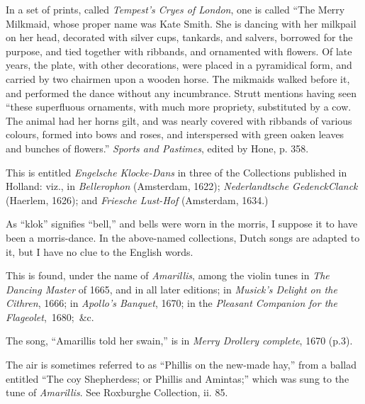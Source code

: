 In a set of prints, called \textit{Tempest's Cryes of London}, one is called “The Merry
Milkmaid, whose proper name was Kate Smith. She is dancing with her milkpail
on her head, decorated with silver cups, tankards, and salvers, borrowed for
the purpose, and tied together with ribbands, and ornamented with flowers. Of
late years, the plate, with other decorations, were placed in a pyramidical form,
and carried by two chairmen upon a wooden horse. The mikmaids walked before
it, and performed the dance without any incumbrance. Strutt mentions having
seen “these superfluous ornaments, with much more propriety, substituted by a
cow. The animal had her horns gilt, and was nearly covered with ribbands of
various colours, formed into bows and roses, and interspersed with green oaken
leaves and bunches of flowers.” \textit{Sports and Pastimes}, edited by Hone, p. 358.



\pagebreak


This is entitled \textit{Engelsche Klocke-Dans} in three of the Collections published in
Holland: viz., in \textit{Bellerophon} (Amsterdam, 1622); \textit{Nederlandtsche GedenckClanck}
(Haerlem, 1626); and \textit{Friesche Lust-Hof} (Amsterdam, 1634.)

As “klok” signifies “bell,” and bells were worn in the morris, I suppose it to
have been a morris-dance. In the above-named collections, Dutch songs are
adapted to it, but I have no clue to the English words.




This is found, under the name of \textit{Amarillis}, among the violin tunes in \textit{The
Dancing Master} of 1665, and in all later editions; in \textit{Musick’s Delight on the
Cithren}, 1666; in \textit{Apollo’s Banquet}, 1670; in the \textit{Pleasant Companion for the
Flageolet},~1680;~\&c.

The song, “Amarillis told her swain,” is in \textit{Merry Drollery complete}, 1670 (p.3).

The air is sometimes referred to as \pagebreak “Phillis on the new-made hay,” from a
ballad entitled “The coy Shepherdess; or Phillis and Amintas;” which was sung
to the tune of \textit{Amarillis}. See Roxburghe Collection, ii. 85.

